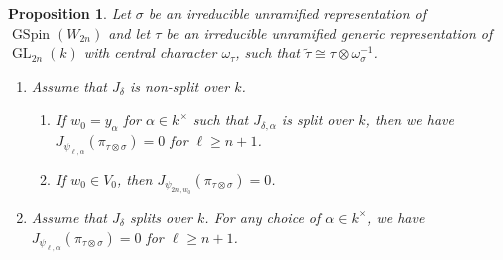 \documentclass[12pt]{amsart}
\newcommand{\wt}{\widetilde}
\newtheorem{proposition}[theorem]{Proposition}%
\theoremstyle{remark}
\DeclareMathOperator{\GL}{GL}
\DeclareMathOperator{\GSpin}{GSpin}
\begin{document}
\begin{proposition}
\label{prop-Jacquet-Module-Unramified-Component-vanishing}
Let $\sigma$ be an irreducible unramified representation of $\GSpin(W_{2n})$ and let $\tau$ be an irreducible unramified generic representation of $\GL_{2n}(k)$ with central character $\omega_{\tau}$, such that $\wt{\tau}\cong \tau\otimes\omega_{\sigma}^{-1}$. 
\begin{enumerate}
\item Assume that $J_{\delta}$ is non-split over $k$. 
\begin{enumerate}
\item If $w_0=y_{\alpha}$ for $\alpha\in k^\times$ such that   $J_{\delta,\alpha}$ is split over $k$, then we have 
 $J_{\psi_{\ell,\alpha}}(\pi_{\tau\otimes \sigma})=0$ for $\ell\geq n+1$.
  \item If $w_0\in V_0$, then $J_{\psi_{{2n},w_0}}(\pi_{\tau\otimes \sigma})=0$.
\end{enumerate}

\item Assume that $J_\delta$ splits over $k$.  For any choice of $\alpha\in k^\times$, we have $J_{\psi_{\ell,\alpha}}(\pi_{\tau\otimes \sigma})=0$ for $\ell\geq  n+1$.
\end{enumerate}
\end{proposition}
\end{document}
